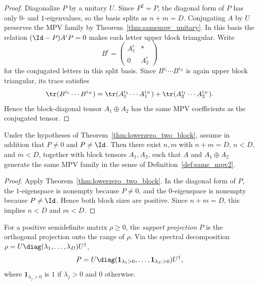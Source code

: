 \begin{proof}
    \leanok
    Diagonalize $P$ by a unitary $U$.
    Since $P^2 = P$, the diagonal form of $P$ has only $0$- and $1$-eigenvalues,
    so the basis splits as $n + m = D$.
    Conjugating $A$ by $U$ preserves the MPV family by
    Theorem~\ref{thm:samempv_unitary}.
    In this basis the relation $(\Id - P) A^i P = 0$ makes each letter upper
    block triangular.
    Write
    \[
        B^i =
        \begin{pmatrix}
            A_1^i &*\\
            0     &A_2^i
        \end{pmatrix}
    \]
    for the conjugated letters in this split basis. Since
    $B^{i_1}\cdots B^{i_N}$ is again upper block triangular, its trace satisfies
    \[
        \tr(B^{i_1}\cdots B^{i_N})
        =
        \tr(A_1^{i_1}\cdots A_1^{i_N})
        +
        \tr(A_2^{i_1}\cdots A_2^{i_N}).
    \]
    Hence the block-diagonal tensor $A_1 \oplus A_2$ has the same MPV
    coefficients as the conjugated tensor.
\end{proof}

\begin{theorem}
    \label{thm:lowerzero_two_block_strict}
    \leanok
    Under the hypotheses of Theorem~\ref{thm:lowerzero_two_block},
    assume in addition that $P \neq 0$ and $P \neq \Id$.
    Then there exist $n,m$ with $n + m = D$, $n < D$, and $m < D$, together
    with block tensors $A_1, A_2$, such that
    $A$ and $A_1 \oplus A_2$ generate the same MPV family in the sense of
    Definition~\ref{def:same_mpv2}.
\end{theorem}

\begin{proof}
    \leanok
    Apply Theorem~\ref{thm:lowerzero_two_block}.
    In the diagonal form of $P$, the $1$-eigenspace is nonempty because
    $P \neq 0$, and the $0$-eigenspace is nonempty because $P \neq \Id$.
    Hence both block sizes are positive.
    Since $n + m = D$, this implies $n < D$ and $m < D$.
\end{proof}

\begin{definition}\label{def:support_proj}
    \leanok
    For a positive semidefinite matrix $\rho \ge 0$, the \emph{support
        projection} $P$ is the orthogonal projection onto the range of $\rho$. Via
    the spectral decomposition
    $\rho = U \diag(\lambda_1,\ldots,\lambda_D) U^\dagger$,
    \[
        P = U \diag(\mathbf{1}_{\lambda_1>0},\ldots,\mathbf{1}_{\lambda_D>0}) U^\dagger,
    \]
    where $\mathbf{1}_{\lambda_j>0}$ is $1$ if $\lambda_j > 0$ and $0$ otherwise.
\end{definition}

